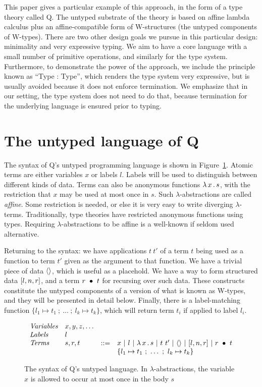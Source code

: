 \documentclass{article}
\begin{document}
This paper gives a particular example of this approach, in the form of
a type theory called Q.  The untyped substrate of the theory is based
on affine lambda calculus plus an affine-compatible form of
W-structures (the untyped components of W-types).  There are two other
design goals we pursue in this particular design: minimality and very
expressive typing.  We aim to have a core language with a small number
of primitive operations, and similarly for the type system.
Furthermore, to demonstrate the power of the approach, we include the
principle known as ``Type : Type'', which renders the type system very
expressive, but is usually avoided because it does not enforce
termination.  We emphasize that in our setting, the type system does
not need to do that, because termination for the underlying language
is ensured prior to typing.

\section{The untyped language of Q}

The syntax of Q's untyped programming language is shown in
Figure~\ref{fig:pl}.  Atomic terms are either variables $x$ or labels
$l$.  Labels will be used to distinguish between different kinds of
data.  Terms can also be anonymous functions $\lambda\, x\, .\, s$, with the
restriction that $x$ may be used at most once in $s$.  Such
$\lambda$-abstractions are called \emph{affine}.  Some restriction is
needed, or else it is very easy to write diverging $\lambda$-terms.
Traditionally, type theories have restricted anonymous functions using
types.  Requiring $\lambda$-abstractions to be affine is a well-known
if seldom used alternative.

Returning to the syntax: we have applications $t\ t'$ of a term $t$
being used as a function to term $t'$ given as the argument to that
function.  We have a trivial piece of data $\langle\rangle$, which is useful
as a placehold.  We have a way to form structured data
$[ l , n, r ]$, and a term $r\ \bullet\ t$ for recursing over such
data.  These constructs constitute the untyped components of a version
of what is known as W-types, and they will be presented in detail
below.  Finally, there is a label-matching function $\{ l_1 \mapsto
t_1\ ;\ \ldots\ ;\ l_k\mapsto t_k \}$, which will return term $t_i$ if
applied to label $l_i$.


\begin{figure}
  \[
  \begin{array}{llll}
    \textit{Variables}  & x,y,z,\ldots & \ &\ \\
    \textit{Labels}  & l & \ &\ \\ 
    \textit{Terms} & s,r,t & ::= & x\ |\ l\ |\ \lam{x}{s}\ |\ t\ t'\ |\ \wunit\ |\ \ctor{l}{n}{r}\ |\ \wrec{r}{t} \\
    \ &\ &\ & \{ l_1 \mapsto t_1\ ;\ \ldots\ ;\ l_k\mapsto t_k \}
  \end{array}
\]
\caption{The syntax of Q's untyped language.  In $\lambda$-abstractions, the variable $x$ is allowed
  to occur at most once in the body $s$}
\label{fig:pl}
\end{figure}
\end{document}
